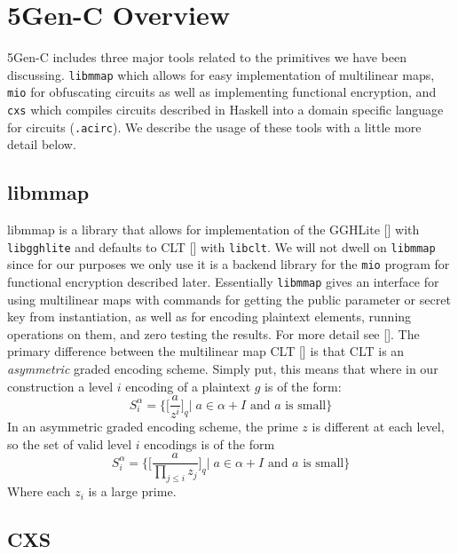 \documentclass[12pt,twoside]{reedthesis}
\begin{document}
      
    \section{5Gen-C Overview}
    5Gen-C includes three major tools related to the primitives we have been discussing. \texttt{libmmap} which allows for easy implementation of multilinear maps, \texttt{mio} for obfuscating circuits as well as implementing functional encryption, and \texttt{cxs} which compiles circuits described in Haskell into a domain specific language for circuits (\texttt{.acirc}). We describe the usage of these tools with a little more detail below.
    
    \subsection{libmmap}
    libmmap is a library that allows for implementation of the GGHLite [\cite{GGHLite}] with \texttt{libgghlite} and defaults to CLT [\cite{CLT13}] with \texttt{libclt}. We will not dwell on \texttt{libmmap} since for our purposes we only use it is a backend library for the \texttt{mio} program for functional encryption described later. Essentially \texttt{libmmap} gives an interface for using multilinear maps with commands for getting the public parameter or secret key from instantiation, as well as for encoding plaintext elements, running operations on them, and zero testing the results. For more detail see [\cite{5genc}]. The primary difference between the multilinear map CLT [\cite{CLT13}] is that CLT is an \textit{asymmetric} graded encoding scheme. Simply put, this means that where in our construction a level $i$ encoding of a plaintext $g$ is of the form:
    $$S_i^\alpha =\bigg\{\bigg[\frac{a}{z^i} \bigg]_q \bigg| \; a \in \alpha + I \text{ and $a$ is small}\bigg\} $$
    In an asymmetric graded encoding scheme, the prime $z$ is different at each level, so the set of valid level $i$ encodings is of the form
    $$S_i^\alpha =\bigg\{\bigg[\frac{a}{\prod_{j\leq i} z_j} \bigg]_q \bigg| \; a \in \alpha + I \text{ and $a$ is small}\bigg\} $$
      Where each $z_i$ is a large prime. 
      \subsection{CXS}
   
\end{document}
